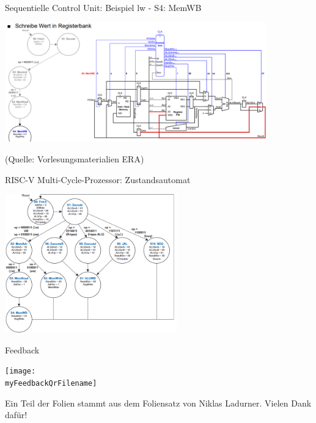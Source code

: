 \documentclass[
  german,            %
  aspectratio=169,    %
]{tumbeamer}
\begin{document}
\begin{frame}[c]{Sequentielle Control Unit: Beispiel lw - S4: MemWB}{}
	\begin{center}
		\includegraphics[width=0.85\textwidth]{w09_lw5_lv.png}
	\end{center}
	\centering
	\tiny (Quelle: Vorlesungsmaterialien ERA)
\end{frame}

\begin{frame}[c]{RISC-V Multi-Cycle-Prozessor: Zustandsautomat}{}
	\begin{center}
		\includegraphics[width=0.56\textwidth]{w09_multicycle_states.png}
	\end{center}
	\centering
\end{frame}

\begin{frame}[c]{Feedback}{} 
  \begin{center}
    \texttt{[image: \\myFeedbackQrFilename]}
  \end{center}
  \begin{center}
    \LARGE \href{\myFeedbackLink}{\myFeedbackLink}
  \end{center}
  \vspace{0.5cm}
  \begin{center}
    \small Ein Teil der Folien stammt aus dem Foliensatz von Niklas Ladurner. Vielen Dank dafür!
  \end{center}
\end{frame}
\end{document}
